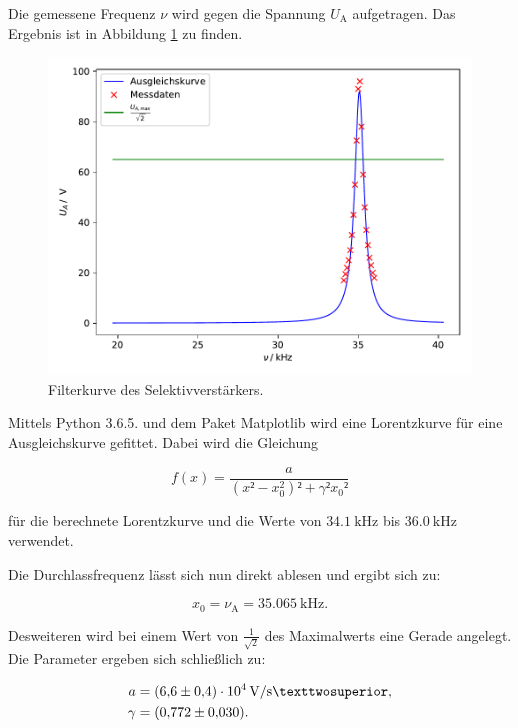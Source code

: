Die gemessene Frequenz $\nu$ wird gegen die Spannung $U_\text{A}$ aufgetragen. Das 
Ergebnis ist in Abbildung \ref{fig:plot1} zu finden. 

\begin{figure}
  \centering
  \includegraphics{content/plot1.pdf}
  \caption{Filterkurve des Selektivverstärkers.}
  \label{fig:plot1}
\end{figure}

Mittels Python 3.6.5. und dem Paket Matplotlib wird eine Lorentzkurve für eine Ausgleichskurve 
gefittet. Dabei wird die Gleichung 

\begin{equation*}
f(x) = \frac{a}{(x²-x_0^2)²+\gamma²x_0²}
\end{equation*}

für die berechnete Lorentzkurve und die Werte von $\SI{34.1}{\kilo\hertz}$ bis $\SI{36.0}{\kilo\hertz}$verwendet. 

Die Durchlassfrequenz lässt sich nun direkt ablesen und ergibt sich zu:

\begin{equation}
x_0 = \nu _\text{A} = \SI{35.065}{\kilo\hertz}.
\end{equation}

Desweiteren wird bei einem Wert von $\frac{1}{\sqrt{2}}$ des Maximalwerts
eine Gerade angelegt. Die Parameter ergeben sich schließlich zu: 

\begin{align*}
a &= \SI{6.6+-0.4e4}{\volt\per\second²},\\
\gamma &= \SI{0.772+-0.03}{}.
\end{align*}

